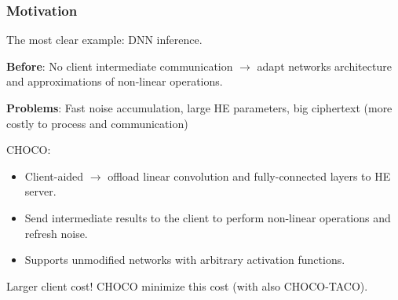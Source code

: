 \documentclass[10pt,handout]{beamer}
\begin{document}
\begin{frame}
\frametitle{Motivation}
The most clear example: DNN inference.

    \textbf{Before}: No client intermediate communication $\rightarrow$ adapt networks architecture and approximations of non-linear operations.

    \textbf{Problems}: Fast noise accumulation, large HE parameters, big ciphertext (more costly to process and communication)

CHOCO:
\begin{itemize}
    \vspace{-0.2cm}  \item Client-aided $\rightarrow$ offload linear convolution and fully-connected layers to HE server.
    \vspace{-0.2cm}\item Send intermediate results to the client to perform non-linear operations and refresh noise.
    \vspace{-0.2cm}\item Supports unmodified networks with arbitrary activation functions.
\end{itemize}

Larger client cost!
CHOCO minimize this cost (with also CHOCO-TACO).

\end{frame}


\end{document}
